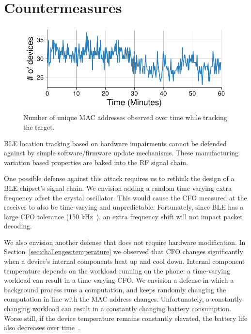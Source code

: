 \section{Countermeasures}
\label{sec:countermeasures}

\begin{figure}[t!]
    \centering
    \includegraphics[width = \linewidth]{bletracking/plots/case_study_android_devno2.pdf} 
    \caption{Number of unique MAC addresses observed over time while tracking the target.}
    \label{fig:android_no}
\end{figure}

BLE location tracking based on hardware impairments cannot be defended against by simple software/firmware update
mechanisms. These manufacturing variation based properties
are baked into the RF signal chain.

One possible defense against this attack requires us to rethink the design of a BLE chipset's signal chain.
%
We envision adding a random time-varying extra frequency offset the crystal oscillator.
%
This would cause the CFO measured at the receiver to also be time-varying and unpredictable.
%
Fortunately, since BLE has a large CFO tolerance (150 kHz~\cite{btcorespec}), an extra frequency shift will not impact packet decoding.
%

We also envision another defense that does not require hardware modification.
%
In Section~\ref{sec:challenges:temperature} we observed that CFO changes significantly when a device's internal components heat up and cool down.
%
Internal component temperature depends on the workload running on the phone: a time-varying workload can result in a time-varying CFO.
%
We envision a defense in which a background process runs a computation, and keeps randomly changing the computation in line with the MAC address changes.
%
Unfortunately, a constantly changing workload can result in a constantly changing battery consumption.
%
Worse still, if the device temperature remains constantly elevated, the battery life also decreases over time~\cite{fireinyourhands}.

